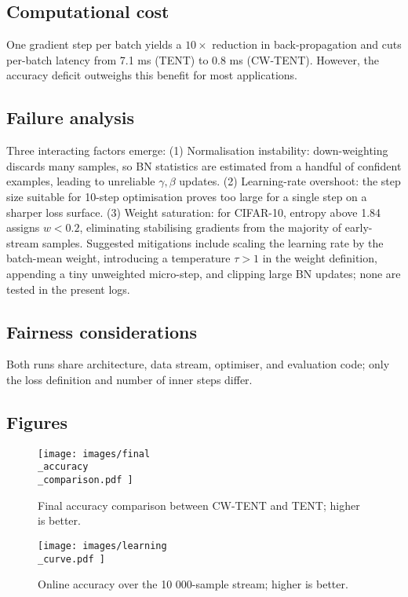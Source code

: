 \documentclass{article} %
\begin{document}
\subsection{Computational cost}
One gradient step per batch yields a \(10\times\) reduction in back-propagation and cuts per-batch latency from 7.1 ms (TENT) to 0.8 ms (CW-TENT). However, the accuracy deficit outweighs this benefit for most applications.

\subsection{Failure analysis}
Three interacting factors emerge: (1) Normalisation instability: down-weighting discards many samples, so BN statistics are estimated from a handful of confident examples, leading to unreliable \(\gamma, \beta\) updates. (2) Learning-rate overshoot: the step size suitable for 10-step optimisation proves too large for a single step on a sharper loss surface. (3) Weight saturation: for CIFAR-10, entropy above 1.84 assigns \(w < 0.2\), eliminating stabilising gradients from the majority of early-stream samples. Suggested mitigations include scaling the learning rate by the batch-mean weight, introducing a temperature \(\tau > 1\) in the weight definition, appending a tiny unweighted micro-step, and clipping large BN updates; none are tested in the present logs.

\subsection{Fairness considerations}
Both runs share architecture, data stream, optimiser, and evaluation code; only the loss definition and number of inner steps differ.

\subsection{Figures}
\begin{figure}[H]
\centering
\texttt{[image:  images/final\\\_accuracy\\\_comparison.pdf ]}
\caption{Final accuracy comparison between CW-TENT and TENT; higher is better.}
\end{figure}

\begin{figure}[H]
\centering
\texttt{[image:  images/learning\\\_curve.pdf ]}
\caption{Online accuracy over the 10 000-sample stream; higher is better.}
\end{figure}
\end{document}

